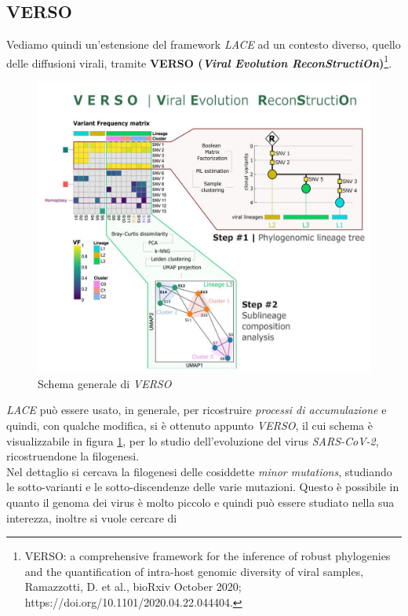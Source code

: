 \documentclass[a4paper,12pt, oneside]{book}
\begin{document}
\subsection{VERSO}
Vediamo quindi un'estensione del framework \textit{LACE} ad un contesto diverso,
quello delle diffusioni virali,
tramite \textbf{VERSO (\textit{Viral Evolution ReconStructiOn})}\footnote{VERSO:
  a comprehensive framework for the 
  inference of robust phylogenies and the quantification
  of intra-host genomic diversity of viral samples,
  Ramazzotti, D. et al., bioRxiv October 2020;
  https://doi.org/10.1101/2020.04.22.044404.}.\\
\begin{figure}
  \centering
  \includegraphics[scale = 0.28]{img/verso.jpg}
  \caption{Schema generale di \textit{VERSO}}
  \label{fig:verso}
\end{figure}
\textit{LACE} può essere usato, in generale, per ricostruire \textit{processi di
accumulazione} e quindi, con qualche modifica, si è ottenuto appunto
\textit{VERSO}, il cui schema è visualizzabile in figura \ref{fig:verso}, per lo
studio dell'evoluzione del virus \textit{SARS-CoV-2}, ricostruendone la
filogenesi.\\
Nel dettaglio si cercava la filogenesi delle cosiddette \textit{minor
  mutations}, studiando le sotto-varianti e le sotto-discendenze delle varie
mutazioni. Questo è possibile in quanto il genoma dei virus è molto piccolo e
quindi può essere studiato nella sua interezza, inoltre si vuole cercare di
\end{document}
